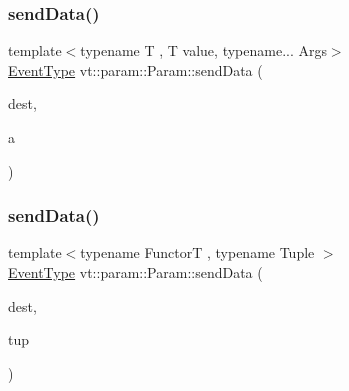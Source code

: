 \mbox{\label{structvt_1_1param_1_1_param_a6ad80695f54db7da23e920bef98af13a}} 
\subsubsection{\texorpdfstring{send\+Data()}{sendData()}\hspace{0.1cm}{\footnotesize\ttfamily [4/7]}}
{\footnotesize\ttfamily template$<$typename T , T value, typename... Args$>$ \\
\hyperlink{namespacevt_a009267401def7ae8bf201892222d060f}{Event\+Type} vt\+::param\+::\+Param\+::send\+Data (\begin{DoxyParamCaption}\item[{\hyperlink{namespacevt_a866da9d0efc19c0a1ce79e9e492f47e2}{Node\+Type} const \&}]{dest,  }\item[{Args \&\&...}]{a }\end{DoxyParamCaption})\hspace{0.3cm}{\ttfamily [inline]}}

\mbox{\label{structvt_1_1param_1_1_param_af49d5db588fcdbf6355cd6a055666531}} 
\subsubsection{\texorpdfstring{send\+Data()}{sendData()}\hspace{0.1cm}{\footnotesize\ttfamily [5/7]}}
{\footnotesize\ttfamily template$<$typename FunctorT , typename Tuple $>$ \\
\hyperlink{namespacevt_a009267401def7ae8bf201892222d060f}{Event\+Type} vt\+::param\+::\+Param\+::send\+Data (\begin{DoxyParamCaption}\item[{\hyperlink{namespacevt_a866da9d0efc19c0a1ce79e9e492f47e2}{Node\+Type} const \&}]{dest,  }\item[{Tuple}]{tup }\end{DoxyParamCaption})\hspace{0.3cm}{\ttfamily [inline]}}

\mbox{\label{structvt_1_1param_1_1_param_a4ab35026b32979ddba2708379ebe8185}} 
